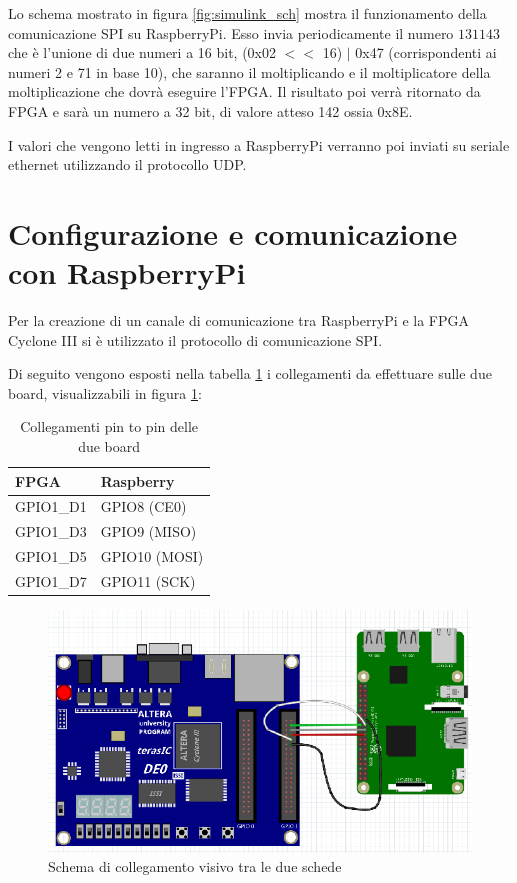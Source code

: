 \documentclass[titlepage]{report}
\begin{document}
		Lo schema mostrato in figura \ref{fig:simulink_sch} mostra il funzionamento della comunicazione SPI su RaspberryPi. Esso invia periodicamente il numero $131143$ che è l'unione di due numeri a 16 bit, (0x02 $<<$ 16) $\mid$ 0x47 (corrispondenti ai numeri 2 e 71 in base 10), che saranno il moltiplicando e il moltiplicatore della moltiplicazione che dovrà eseguire l'FPGA. Il risultato poi verrà ritornato da FPGA e sarà un numero a 32 bit, di valore atteso 142 ossia 0x8E.

		I valori che vengono letti in ingresso a RaspberryPi verranno poi inviati su seriale ethernet utilizzando il protocollo UDP.

	\section*{Configurazione e comunicazione con RaspberryPi}
	\label{sec:configurazione_raspberrypi}
			
		Per la creazione di un canale di comunicazione tra RaspberryPi e la FPGA Cyclone III si è utilizzato il protocollo di comunicazione SPI.

		Di seguito vengono esposti nella tabella \ref{tab:wiring} i collegamenti da effettuare sulle due board, visualizzabili in figura \ref{fig:wiring}:

		\begin{table}[ht]
			\centering
			\begin{tabular}{|l|l|}
				\rowcolor{gray!25} %
				\hline
				\textbf{FPGA} & \textbf{Raspberry} \\
				\hline
				GPIO1\_D1 & GPIO8 (CE0) \\
				\hline
				GPIO1\_D3 & GPIO9 (MISO) \\
				\hline
				GPIO1\_D5 & GPIO10 (MOSI) \\
				\hline
				GPIO1\_D7 & GPIO11 (SCK) \\
				\hline
			\end{tabular}
			\caption{Collegamenti pin to pin delle due board}
			\label{tab:wiring}
		\end{table}

		\begin{figure}[ht]
			\centering
			\includegraphics[scale=0.6]{./img/link_fpga_raspi.png}
			\caption{Schema di collegamento visivo tra le due schede}
			\label{fig:wiring}
		\end{figure}
\end{document}
